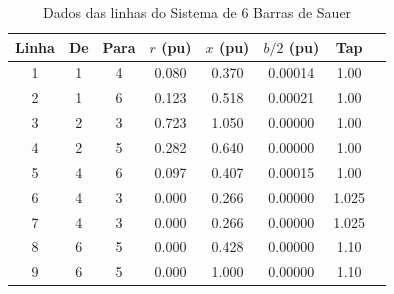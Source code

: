 \documentclass[journal]{IEEEtran}
\begin{document}
\begin{table}[h!]
\centering
\caption{Dados das linhas do Sistema de 6 Barras de Sauer}
\label{tab:sauer6bus_linhas}
\begin{tabular}{c|c|c|c|c|c|c|c}
\hline
Linha & De & Para & $r$ (pu) & $x$ (pu) & $b/2$ (pu) & Tap \\
\hline
1 & 1 & 4 & 0.080 & 0.370 & 0.00014 & 1.00 \\
2 & 1 & 6 & 0.123 & 0.518 & 0.00021 & 1.00 \\
3 & 2 & 3 & 0.723 & 1.050 & 0.00000 & 1.00 \\
4 & 2 & 5 & 0.282 & 0.640 & 0.00000 & 1.00 \\
5 & 4 & 6 & 0.097 & 0.407 & 0.00015 & 1.00 \\
6 & 4 & 3 & 0.000 & 0.266 & 0.00000 & 1.025 \\
7 & 4 & 3 & 0.000 & 0.266 & 0.00000 & 1.025 \\
8 & 6 & 5 & 0.000 & 0.428 & 0.00000 & 1.10 \\
9 & 6 & 5 & 0.000 & 1.000 & 0.00000 & 1.10 \\
\hline
\end{tabular}
\end{table}
\end{document}
